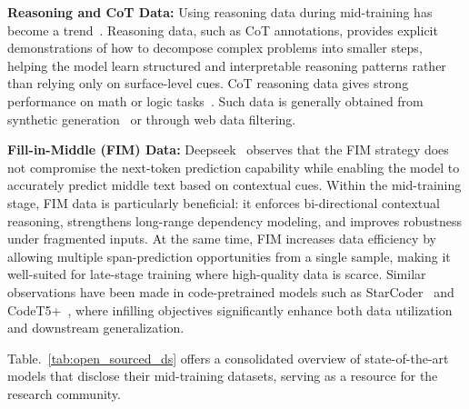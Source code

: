 \noindent\textbf{Reasoning and CoT Data:}
Using reasoning data during mid-training has become a trend~\cite{tang2025pangu, yang2025qwen3}. Reasoning data, such as CoT annotations, provides explicit demonstrations of how to decompose complex problems into smaller steps, helping the model learn structured and interpretable reasoning patterns rather than relying only on surface-level cues. CoT reasoning data gives strong performance on math or logic tasks~\cite{sprague2024cot}. Such data is generally obtained from synthetic generation~\cite{abdin2024phi3, abdin2024phi} or through web data filtering. 


\noindent\textbf{Fill-in-Middle (FIM) Data:} Deepseek~\cite{DeepSeekAI2024DeepSeekV3TR, zhu2024deepseek} observes that the FIM strategy does not compromise the next-token prediction capability while enabling the model to accurately predict middle text based on contextual cues. Within the mid-training stage, FIM data is particularly beneficial: it enforces bi-directional contextual reasoning, strengthens long-range dependency modeling, and improves robustness under fragmented inputs. At the same time, FIM increases data efficiency by allowing multiple span-prediction opportunities from a single sample, making it well-suited for late-stage training where high-quality data is scarce. Similar observations have been made in code-pretrained models such as StarCoder~\cite{li2023starcoder} and CodeT5+~\cite{wang2023codet5+}, where infilling objectives significantly enhance both data utilization and downstream generalization.

Table.~\ref{tab:open_sourced_ds} offers a consolidated overview of state-of-the-art models that disclose their mid-training datasets, serving as a resource for the research community.






